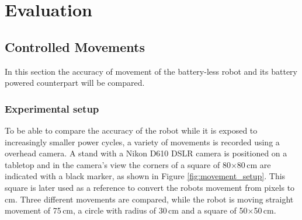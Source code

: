 \chapter{Evaluation} 

\section{Controlled Movements}
\label{sec:controlled_movements}




In this section the accuracy of movement of the battery-less robot and its battery powered counterpart will be compared.

\subsection{Experimental setup}

To be able to compare the accuracy of the robot while it is exposed to increasingly smaller power cycles, a variety of movements is recorded using a overhead camera.
A stand with a Nikon D610 DSLR camera is positioned on a tabletop and in the camera's view the corners of a square of 80$\times$80\,cm are indicated with a black marker, as shown in Figure \ref{fig:movement_setup}.
This square is later used as a reference to convert the robots movement from pixels to cm.
Three different movements are compared, while the robot is moving straight movement of 75\,cm, a circle with radius of 30\,cm and a square of 50$\times$50\,cm.

